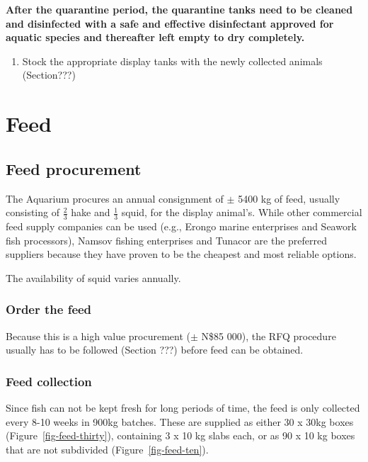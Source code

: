 \documentclass[
  letterpaper,
  DIV=11,
  numbers=noendperiod]{scrreprt}
\providecommand{\tightlist}{%
  \setlength{\itemsep}{0pt}\setlength{\parskip}{0pt}}\usepackage{longtable,booktabs,array}
\begin{document}
\textbf{After the quarantine period, the quarantine tanks need to be
cleaned and disinfected with a safe and effective disinfectant approved
for aquatic species and thereafter left empty to dry completely.}

\begin{enumerate}
\def\labelenumi{\arabic{enumi}.}
\setcounter{enumi}{29}
\tightlist
\item
  Stock the appropriate display tanks with the newly collected animals
  (Section???)
\end{enumerate}

\hypertarget{feed}{%
\chapter{Feed}\label{feed}}

\hypertarget{feed-procurement}{%
\section{Feed procurement}\label{feed-procurement}}

The Aquarium procures an annual consignment of \(\pm\) 5400 kg of feed,
usually consisting of \(\frac{2}{3}\) hake and \(\frac{1}{3}\) squid,
for the display animal's. While other commercial feed supply companies
can be used (e.g., Erongo marine enterprises and Seawork fish
processors), Namsov fishing enterprises and Tunacor are the preferred
suppliers because they have proven to be the cheapest and most reliable
options.

{The availability of squid varies annually}.

\hypertarget{order-the-feed}{%
\subsection{Order the feed}\label{order-the-feed}}

Because this is a high value procurement (\(\pm\) N\$85 000), the RFQ
procedure usually has to be followed (Section ???) before feed can be
obtained.

\hypertarget{feed-collection}{%
\subsection{Feed collection}\label{feed-collection}}

Since fish can not be kept fresh for long periods of time, the feed is
only collected every 8-10 weeks in 900kg batches. These are supplied as
either 30 x 30kg boxes (Figure~\ref{fig-feed-thirty}), containing 3 x 10
kg slabs each, or as 90 x 10 kg boxes that are not subdivided
(Figure~\ref{fig-feed-ten}).
\end{document}
